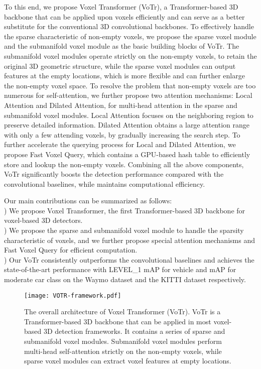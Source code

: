 \documentclass[10pt,twocolumn,letterpaper]{article}
\begin{document}
To this end, we propose Voxel Transformer (VoTr), a Transformer-based 3D backbone that can be applied upon voxels efficiently and can serve as a better substitute for the conventional 3D convolutional backbones. To effectively handle the sparse characteristic of non-empty voxels, we propose the sparse voxel module and the submanifold voxel module as the basic building blocks of VoTr. The submanifold voxel modules operate strictly on the non-empty voxels, to retain the original 3D geometric structure, while the sparse voxel modules can output features at the empty locations, which is more flexible and can further enlarge the non-empty voxel space. To resolve the problem that non-empty voxels are too numerous for self-attention, we further propose two attention mechanisms: Local Attention and Dilated Attention, for multi-head attention in the sparse and submanifold voxel modules. Local Attention focuses on the neighboring region to preserve detailed information. Dilated Attention obtains a large attention range with only a few attending voxels, by gradually increasing the search step. To further accelerate the querying process for Local and Dilated Attention, we propose Fast Voxel Query, which contains a GPU-based hash table to efficiently store and lookup the non-empty voxels. Combining all the above components, VoTr significantly boosts the detection performance compared with the convolutional baselines, while maintains computational efficiency.

Our main contributions can be summarized as follows:\\
) We propose Voxel Transformer, the first Transformer-based 3D backbone for voxel-based 3D detectors.\\
) We propose the sparse and submanifold voxel module to handle the sparsity characteristic of voxels, and we further propose special attention mechanisms and Fast Voxel Query for efficient computation.\\ 
) Our VoTr consistently outperforms the convolutional baselines and achieves the state-of-the-art performance with  LEVEL\_1 mAP for vehicle and  mAP for moderate car class on the Waymo dataset and the KITTI dataset respectively.

\begin{figure*}[!t]
\centering
\texttt{[image: VOTR-framework.pdf]}
\caption{The overall architecture of Voxel Transformer (VoTr). VoTr is a Transformer-based 3D backbone that can be applied in most voxel-based 3D detection frameworks. It contains a series of sparse and submanifold voxel modules. Submanifold voxel modules perform multi-head self-attention strictly on the non-empty voxels, while sparse voxel modules can extract voxel features at empty locations.}
\label{fig_framework}
\end{figure*}
\end{document}
